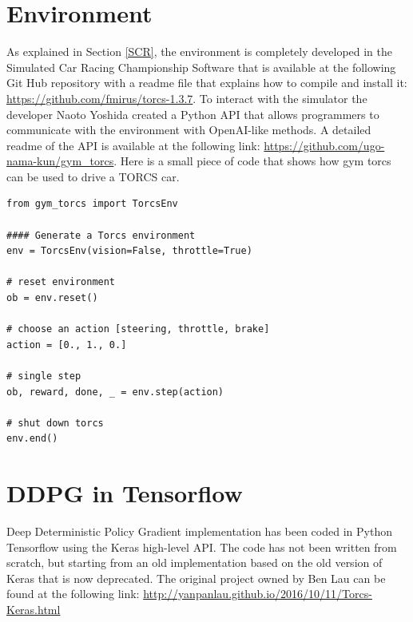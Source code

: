 \documentclass[Lau,oneside,noexaminfo]{sapthesis} %
\begin{document}
\section{Environment}
As explained in Section \ref{SCR}, the environment is completely developed in the Simulated Car Racing Championship Software that is available at the following Git Hub repository with a readme file that explains how to compile and install it: \url{https://github.com/fmirus/torcs-1.3.7}.
To interact with the simulator the developer Naoto Yoshida created a Python API that allows programmers to communicate with the environment with OpenAI-like methods. A detailed readme of the API is available at the following link: \url{https://github.com/ugo-nama-kun/gym_torcs}.
Here is a small piece of code that shows how gym torcs can be used to drive a TORCS car.

\begin{lstlisting}
from gym_torcs import TorcsEnv

#### Generate a Torcs environment
env = TorcsEnv(vision=False, throttle=True)

# reset environment
ob = env.reset()

# choose an action [steering, throttle, brake]
action = [0., 1., 0.]

# single step
ob, reward, done, _ = env.step(action)

# shut down torcs
env.end()
\end{lstlisting}
\section{DDPG in Tensorflow}
Deep Deterministic Policy Gradient implementation has been coded in Python Tensorflow using the Keras high-level API. The code has not been written from scratch, but starting from an old implementation based on the old version of Keras that is now deprecated. The original project owned by Ben Lau can be found at the following link: \url{http://yanpanlau.github.io/2016/10/11/Torcs-Keras.html}
\end{document}
